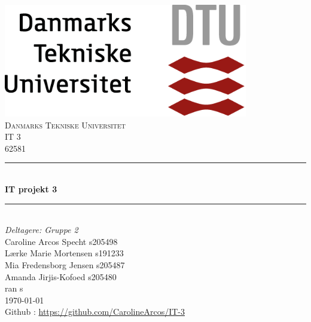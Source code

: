 


\begin{titlepage}


\newcommand{\HRule}{\rule{\linewidth}{0.5mm}} 							%
\center 
 
 \includegraphics[width=0.8\textwidth]{Billeder/dtu.png}\\[1cm] 	%
\vfill 
\textsc{\LARGE Danmarks Tekniske Universitet}\\[1cm]

\textsc{\Large IT 3}\\[0.2cm]
\textsc{\large 62581}\\[1cm] 										%
\HRule \\[0.8cm]
{ \huge \bfseries IT projekt 3}\\[0.7cm]								%
\HRule \\[2cm]
\large
\emph{Deltagere: Gruppe 2 }\\

Caroline Arcos Specht s205498\\	
Lærke  Marie Mortensen s191233\\	
Mia Fredensborg Jensen s205487\\
Amanda Jirjis-Kofoed s205480\\
ran s\\[1.5cm]	
\today \\
Github :  \url{https://github.com/CarolineArcos/IT-3} 

\end{titlepage}